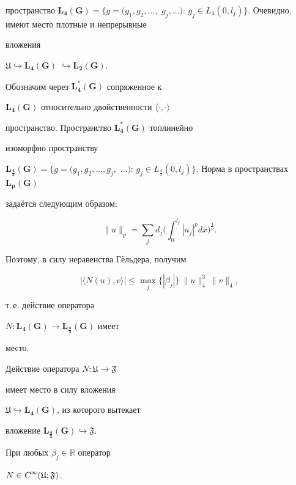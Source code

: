 пространство $\mathbf{L_4(G)}=\{g=(g_1, g_2, \dots,$ $g_j, \dots):\,g_j\in

L_4(0,l_j)\}$. Очевидно, имеют место плотные и непрерывные

вложения

$\mathfrak{U}\hookrightarrow\mathbf{L_4(G)}$ $\hookrightarrow\mathbf{L_2(G)}$.

Обозначим через $\mathbf{L_4^*(G)}$ сопряженное к

$\mathbf{L_4(G)}$ относительно двой\-ствен\-нос\-ти $\langle\cdot, \cdot\rangle$

пространство. Пространство $\mathbf{L_4^*(G)}$ топ\-ли\-ней\-но

изоморфно про\-стран\-ству

$\mathbf{L_{\frac{4}{3}}(G)}=\{g=(g_1, g_2, \dots, g_j,$ $\dots):\,g_j\in

L_{\frac{4}{3}}(0, l_j)\}$. Норма в пространствах $\mathbf{L_p(G)}$

задаётся следующим образом:

$$\|u\|_p=\sum\limits_jd_j\biggl(\int_0^{l_j}|u_j|^pdx\biggr)^{\frac{1}{p}}.$$

Поэтому, в силу неравенства Гёльдера, получим

$$|\langle N(u), v\rangle|\leq \max\limits_j \{|\beta_j|\} \ \|u\|_4^3 \ \|v\|_4,$$

т.\,е. действие оператора

$N:\mathbf{L_4(G)}\rightarrow\mathbf{L_{\frac{4}{3}}(G)}$ имеет

место.

Действие опе\-ра\-то\-ра $N:\mathfrak{U}\rightarrow\mathfrak{F}$

имеет место в силу вложения

$\mathfrak{U}\hookrightarrow\mathbf{L_4(G)}$, из которого вытекает

вложение $\mathbf{L_{\frac{4}{3}}(G)}\hookrightarrow\mathfrak{F}$.

\begin{lemma}[1.2]

При любых $\beta_j\in\mathbb{R}$ оператор

$N\in\textsl{C}^\infty(\mathfrak{U;F})$.

\end{lemma}

